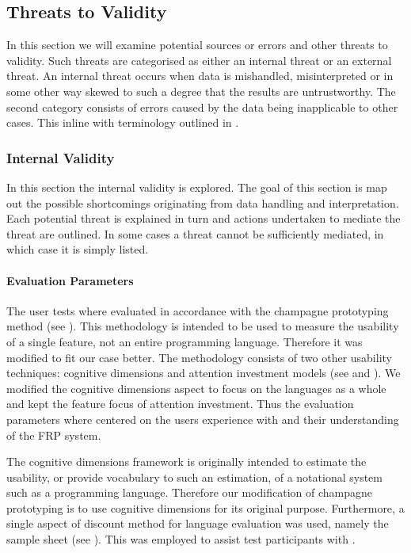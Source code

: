 \subsection{Threats to Validity} \label{sec:validity}
In this section we will examine potential sources or errors and other threats to validity. Such threats are categorised as either an internal threat or an external threat. An internal threat occurs when data is mishandled, misinterpreted or in some other way skewed to such a degree that the results are untrustworthy. The second category consists of errors caused by the data being inapplicable to other cases. This inline with terminology outlined in \cite{mcleod:validity}.


\subsubsection{Internal Validity}
In this section the internal validity is explored. The goal of this section is map out the possible  shortcomings originating from data handling and interpretation. Each potential threat is explained in turn and actions undertaken to mediate the threat are outlined. In some cases a threat cannot be sufficiently mediated, in which case it is simply listed.

\paragraph{Evaluation Parameters}
The user tests where evaluated in accordance with the champagne prototyping method (see ). This methodology is intended to be used to measure the usability of a single feature, not an entire programming language. Therefore it was modified to fit our case better. The methodology consists of two other usability techniques: cognitive dimensions and attention investment models (see  and ). We modified the cognitive dimensions aspect to focus on the languages as a whole and kept the feature focus of attention investment. Thus the evaluation parameters where centered on the users experience with \fs and their understanding of the \gls{FRP} system.


The cognitive dimensions framework is originally intended to  estimate the usability, or provide vocabulary to such an estimation, of a notational system such as a programming language. Therefore our modification of champagne prototyping is to use cognitive dimensions for its original purpose. Furthermore, a single aspect of discount method for language evaluation was used, namely the sample sheet (see ). This was employed to assist test participants with \fs.

